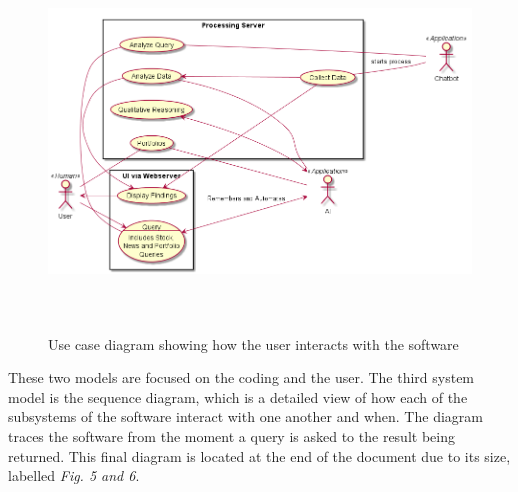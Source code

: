 \documentclass[]{IEEEtran}
\begin{document}
	\begin{figure}[h]
		\includegraphics[width=\textwidth, height=10cm]{usecase}
		\caption{Use case diagram showing how the user interacts with the software}
	\end{figure}
	
	These two models are focused on the coding and the user. The third system model is the sequence diagram, which is a detailed view of how each of the subsystems of the software interact with one another and when. The diagram traces the software from the moment a query is asked to the result being returned. This final diagram is located at the end of the document due to its size, labelled \textit{Fig. 5 and 6}.
	
\end{document}
